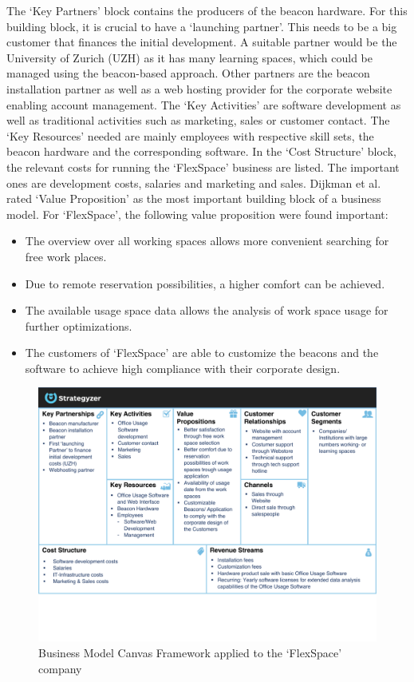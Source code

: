 		The `Key Partners' block contains the producers of the beacon hardware. For this building block, it is crucial to have a `launching partner'. This needs to be a big customer that finances the initial development. A suitable partner would be the University of Zurich (UZH) as it has many learning spaces, which could be managed using the beacon-based approach. Other partners are the beacon installation partner as well as a web hosting provider for the corporate website enabling account management. The `Key Activities' are software development as well as traditional activities such as marketing, sales or customer contact. The `Key Resources' needed are mainly employees with respective skill sets, the beacon hardware and the corresponding software. In the `Cost Structure' block, the relevant costs for running the `FlexSpace' business are listed. The important ones are development costs, salaries and marketing and sales. Dijkman et al. \cite{dijkman} rated `Value Proposition' as the most important building block of a business model. For `FlexSpace', the following value proposition were found important:
		\vspace{-1em}
		\begin{itemize}
			\item The overview over all working spaces allows more convenient searching for free work places.
			\item Due to remote reservation possibilities, a higher comfort can be achieved. 
			\item The available usage space data allows the analysis of work space usage for further optimizations.
			\item The customers of `FlexSpace' are able to customize the beacons and the software to achieve high compliance with their corporate design.  
		\end{itemize}
		\vspace{-1em}

			\begin{figure}[!htb]
			    \begin{center}
			    \includegraphics[scale=0.6]{Talk11/use_case_dijkman.pdf}
			    \end{center}
			    \caption{Business Model Canvas Framework applied to the `FlexSpace' company}
			    \label{fig:bmc_flex}
			\end{figure}

